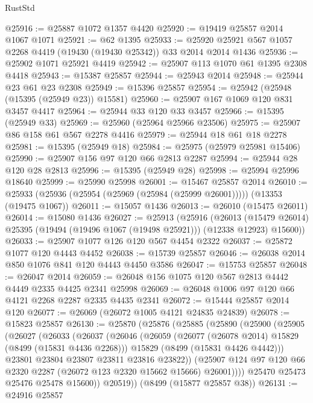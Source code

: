 \begin{lexlean}{RustStd}
\begin{coremodule}
@25916 := @25887 @1072 @1357 @4420
@25920 := @19419 @25857 @2014 @1067 @1071
@25921 := @62 @1395
@25933 := @25920 @25921 @567 @1057 @2268 @4419 (@19430 (@19430 @25342)) @33 @2014 @2014 @1436
@25936 := @25902 @1071 @25921 @4419
@25942 := @25907 @113 @1070 @61 @1395 @2308 @4418
@25943 := @15387 @25857
@25944 := @25943 @2014
@25948 := @25944 @23 @61 @23 @2308
@25949 := @15396 @25857
@25954 := @25942 (@25948 (@15395 (@25949 @23)) @15581)
@25960 := @25907 @167 @1069 @120 @831 @3457 @4417
@25964 := @25944 @33 @120 @33 @3457
@25966 := @15395 (@25949 @33)
@25969 := @25960 (@25964 @25966 @23506)
@25975 := @25907 @86 @158 @61 @567 @2278 @4416
@25979 := @25944 @18 @61 @18 @2278
@25981 := @15395 (@25949 @18)
@25984 := @25975 (@25979 @25981 @15406)
@25990 := @25907 @156 @97 @120 @66 @2813 @2287
@25994 := @25944 @28 @120 @28 @2813
@25996 := @15395 (@25949 @28)
@25998 := @25994 @25996 @18640
@25999 := @25990 @25998
@26001 := @15467 @25857 @2014
@26010 := @25933 (@25936 (@25954 (@25969 (@25984 (@25999 @26001))))) (@13353 (@19475 @1067))
@26011 := @15057 @1436
@26013 := @26010 (@15475 @26011)
@26014 := @15080 @1436
@26027 := @25913
    (@25916
      (@26013
        (@15479 @26014)
        @25395
        (@19494 (@19496 @1067 (@19498 @25921)))
        (@12338 @12923)
        @15600))
@26033 := @25907 @1077 @126 @120 @567 @4454 @2322
@26037 := @25872 @1077 @120 @4443 @4452
@26038 := @15739 @25857
@26046 := @26038 @2014 @850 @1076 @841 @120 @4443 @4450 @3586
@26047 := @15753 @25857
@26048 := @26047 @2014
@26059 := @26048 @156 @1075 @120 @567 @2813 @4442 @4449 @2335 @4425 @2341 @25998
@26069 := @26048 @1006 @97 @120 @66 @4121 @2268 @2287 @2335 @4435 @2341
@26072 := @15444 @25857 @2014 @120
@26077 := @26069 (@26072 @1005 @4121 @24835 @24839)
@26078 := @15823 @25857
@26130 := @25870
    (@25876
      (@25885
        (@25890
          (@25900
            (@25905
              (@26027
                (@26033
                  (@26037
                    (@26046
                      (@26059
                        (@26077 (@26078 @2014) @15829 (@8499 (@15831 @4436 @2268)))
                        @15829
                        (@8499 (@15831 @4426 @4442)))
                      @23801
                      @23804
                      @23807
                      @23811
                      @23816
                      @23822))
                  (@25907 @124 @97 @120 @66 @2320 @2287 (@26072 @123 @2320 @15662 @15666) @26001))))
            @25470
            @25473
            @25476
            @25478
            @15600))
        @20519))
    (@8499 (@15877 @25857 @38))
@26131 := @24916 @25857

\end{coremodule}
\end{lexlean}
